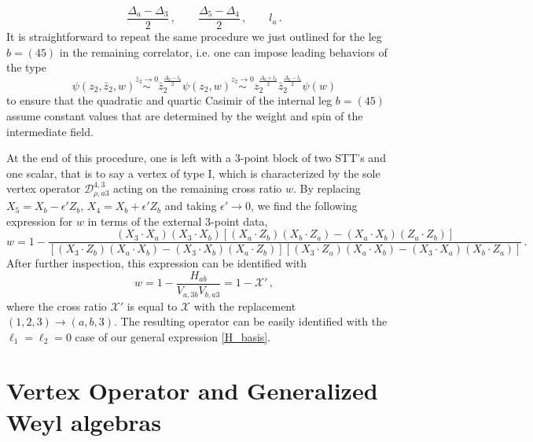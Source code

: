 \documentclass{article}
\begin{document}
\begin{equation}
        \frac{\Delta_{a}-\Delta_3}{2}\,, \qquad 
        \frac{\Delta_5-\Delta_4}{2}\,, \qquad l_a\,.
\end{equation}
It is straightforward to repeat the same procedure we just outlined for the leg $b=(45)$ 
in the remaining correlator, i.e. one can impose leading behaviors of the type
\begin{equation}
    \psi(z_2,\bar{z}_2,w)\stackrel{\bar{z}_2\rightarrow 0}{\sim} 
    \bar{z}_2^{\frac{\Delta_b-l_{b}}{2}}\psi(z_2,w)
    \stackrel{z_2\rightarrow 0}
    {\sim} z_2^{\frac{\Delta_{b}+l_{b}}{2}}
    \bar{z}_2^{\frac{\Delta_{b}-l_{b}}{2}}\psi(w)
\end{equation}
to ensure that the quadratic and quartic Casimir of the internal leg $b=(45)$ assume
constant values that are determined by the weight and spin of the intermediate field. 

At the end of this procedure, one is left with a 3-point block of two STT's 
and one scalar, that is to say a vertex of type I, which is characterized by the sole vertex 
operator $\mathcal{D}_{\rho,a3}^{4,3}$ acting on the remaining cross 
ratio $w$. By replacing 
$X_5=X_b-\epsilon'Z_b$, $X_4=X_b+\epsilon' Z_b$ and taking $\epsilon'\rightarrow 0$, we find the following 
expression for $w$ in terms of the external 3-point data,
\begin{equation}
    w=1-\frac{ (X_3\cdot X_a)(X_3\cdot X_b)\left[(X_a\cdot Z_b)(X_b\cdot Z_a)-(X_a\cdot X_b)(Z_a\cdot Z_b)\right]}{\left[(X_3\cdot Z_b)(X_a\cdot X_b)-(X_3\cdot X_b)(X_a\cdot Z_b)\right] \left[(X_3\cdot Z_a)(X_a\cdot X_b)-(X_3\cdot X_a)(X_b\cdot Z_a)\right]}\,.
\end{equation}
After further inspection, this expression can be identified with
\begin{equation}
    w=1-\frac{H_{ab}}{V_{a,3b}V_{b,a3}}    =1-\mathcal{X}'\,,    
\end{equation}
where the cross ratio $\mathcal{X}'$ is equal to $\mathcal{X}$ with the replacement $(1,2,3)\rightarrow (a,b,3)$. The resulting operator can be easily identified with the $\ell_1=\ell_2=0$ case of
our general expression \eqref{H_basis}. 


 
\section{Vertex Operator and Generalized Weyl algebras} 
\label{sect:GeneralizedWeyl}
\end{document}

